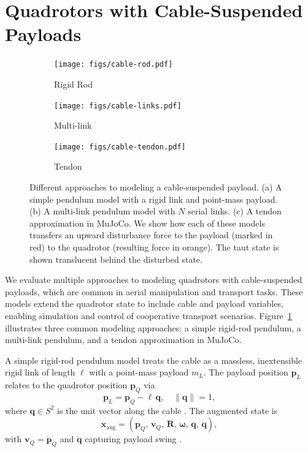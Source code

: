 \section{Quadrotors with Cable-Suspended Payloads}
\label{sec:quadrotor_with_payloads}
\begin{figure}

  \centering
  \begin{subfigure}[t]{0.3\textwidth}
    \centering
    \texttt{[image: figs/cable-rod.pdf]}
    \caption{Rigid Rod}
  \end{subfigure}
  \begin{subfigure}[t]{0.3\textwidth}
    \centering
    \texttt{[image: figs/cable-links.pdf]}
    \caption{Multi-link}
  \end{subfigure}
  \begin{subfigure}[t]{0.3\textwidth}
    \centering
    \texttt{[image: figs/cable-tendon.pdf]}
    \caption{Tendon}
  \end{subfigure}
  \caption[Cable Modeling Approaches]{Different approaches to modeling a cable-suspended payload. (a) A simple pendulum model with a rigid link and point-mass payload. (b) A multi-link pendulum model with \(N\) serial links. (c) A tendon approximation in MuJoCo. We show how each of these models transfers an upward disturbance force to the payload (marked in red) to the quadrotor (resulting force in orange). The taut state is shown translucent behind the disturbed state.}
  \label{fig:cable_models}
\end{figure}
We evaluate multiple approaches to modeling quadrotors with cable-suspended payloads, which are common in aerial manipulation and transport tasks. These models extend the quadrotor state to include cable and payload variables, enabling simulation and control of cooperative transport scenarios. Figure~\ref{fig:cable_models} illustrates three common modeling approaches: a simple rigid-rod pendulum, a multi-link pendulum, and a tendon approximation in MuJoCo.

A simple rigid-rod pendulum model treats the cable as a massless, inextensible rigid link of length \(\ell\) with a point-mass payload \(m_L\). The payload position \(\mathbf{p}_L\) relates to the quadrotor position \(\mathbf{p}_Q\) via
\begin{equation}
\mathbf{p}_L = \mathbf{p}_Q - \ell\,\mathbf{q}, 
\quad
\|\mathbf{q}\| = 1,
\end{equation}
where \(\mathbf{q}\in S^2\) is the unit vector along the cable \cite{estevez_review_2024}. The augmented state is
\begin{equation}
\mathbf{x}_{\mathrm{aug}} = (\mathbf{p}_Q,\,\mathbf{v}_Q,\,\mathbf{R},\,\boldsymbol{\omega},\,\mathbf{q},\,\dot{\mathbf{q}}),
\end{equation}
with \(\mathbf{v}_Q = \dot{\mathbf{p}}_Q\) and \(\dot{\mathbf{q}}\) capturing payload swing \cite{wahba_kinodynamic_2024}.

